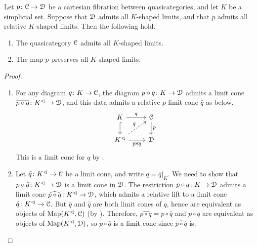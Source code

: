 \documentclass[main.tex]{subfiles}
\begin{document}
\begin{lemma}
  \label{lemma:existence_and_preservation_of_limits}
  Let $p\colon \mathcal{C} \to \mathcal{D}$ be a cartesian fibration between quasicategories, and let $K$ be a simplicial set. Suppose that $\mathcal{D}$ admits all $K$-shaped limits, and that $p$ admits all relative $K$-shaped limits. Then the following hold.
  \begin{enumerate}
    \item The quasicategory $\mathcal{C}$ admits all $K$-shaped limits.

    \item The map $p$ preserves all $K$-shaped limits.
  \end{enumerate}
\end{lemma}
\begin{proof}
  \begin{enumerate}
    \item For any diagram $q\colon K \to \mathcal{C}$, the diagram $p \circ q\colon K \to \mathcal{D}$ admits a limit cone $\overline{p \circ q}\colon K^{\vartriangleleft} \to \mathcal{D}$, and this data admits a relative $p$-limit cone $\bar{q}$ as below.
      \begin{equation*}
        \begin{tikzcd}
          K
          \arrow[r, "q"]
          \arrow[d, hook]
          & \category{C}
          \arrow[d, "p"]
          \\
          K\cone
          \arrow[r, swap, "\overline{p \circ q}"]
          \arrow[ur, dashed, "\bar{q}"]
          & \category{D}
        \end{tikzcd}
      \end{equation*}
      This is a limit cone for $q$ by \cite[Prop.\ 4.3.1.5]{highertopostheory}.

    \item Let $\bar{q}\colon K^{\vartriangleleft} \to \mathcal{C}$ be a limit cone, and write $q = \bar{q}|_{K}$. We need to show that $p \circ \bar{q}\colon K^{\vartriangleleft} \to \mathcal{D}$ is a limit cone in $\mathcal{D}$. The restriction $p \circ q\colon K \to \mathcal{D}$ admits a limit cone $\widehat{p \circ q}\colon K^{\vartriangleleft} \to \mathcal{D}$, which admits a relative lift to a limit cone $\hat{q}\colon K^{\vartriangleleft} \to \mathcal{C}$. But $\bar{q}$ and $\hat{q}$ are both limit cones of $q$, hence are equivalent as objects of $\mathrm{Map}(K^{\vartriangleleft}, \mathcal{C})$ (by \cite[Prop.\ 4.3.1.5]{highertopostheory}). Therefore, $\widehat{p \circ q} = p \circ \hat{q}$ and $p \circ \bar{q}$ are equivalent as objects of $\mathrm{Map}(K^{\vartriangleleft}, \mathcal{D})$, so $p \circ \bar{q}$ is a limit cone since $\widehat{p \circ q}$ is.
  \end{enumerate}
\end{proof}
\end{document}
